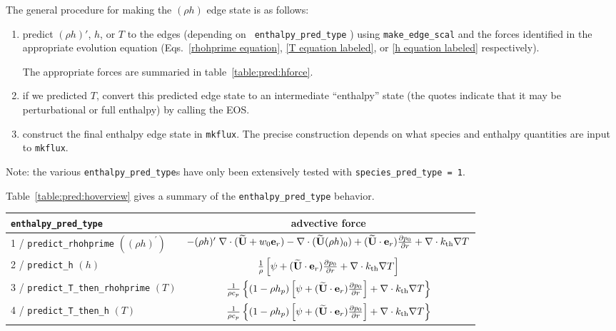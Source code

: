 The general procedure for making the $(\rho h)$ edge state is as follows:
\begin{enumerate}
\item predict $(\rho h)'$, $h$, or $T$ to the edges (depending on {\tt
  enthalpy\_pred\_type} ) using {\tt make\_edge\_scal} and the forces
  identified in the appropriate evolution equation
  (Eqs.~\ref{rhohprime equation}, \ref{T equation labeled}, or \ref{h
    equation labeled} respectively).

  The appropriate forces are summaried in table~\ref{table:pred:hforce}.

\item if we predicted $T$, convert this predicted
  edge state to an intermediate ``enthalpy'' state (the quotes
  indicate that it may be perturbational or full enthalpy) by calling
  the EOS.
 
\item construct the final enthalpy edge state in {\tt mkflux}.  The
  precise construction depends on what species and enthalpy quantities
  are input to {\tt mkflux}.

\end{enumerate}

\noindent Note: the various {\tt enthalpy\_pred\_type}s have only been
extensively tested with {\tt species\_pred\_type = 1}.

Table~\ref{table:pred:hoverview}
gives a summary
of the {\tt enthalpy\_pred\_type} behavior.


\begin{table*}[h]
\centering
\caption{Forcing term into {\tt make\_edge\_scal}}
\label{table:pred:hforce}
\renewcommand{\arraystretch}{1.5}
\begin{tabular}{l|c}
\hline
\hline
{\tt enthalpy\_pred\_type} &   {advective force} \\
\hline
1 / {\tt predict\_rhohprime} $((\rho h)^\prime)$ &  
 $-(\rho h)^\prime \; \nabla \cdot (\widetilde{{\bf U}}+w_0 \mathbf{e}_r) - 
 \nabla \cdot (\widetilde{{\bf U}} (\rho h)_0) + (\widetilde{{\bf U}} \cdot \mathbf{e}_r) \frac{\partial p_0}{\partial r} + \nabla \cdot k_{\rm th} \nabla T$ \\
2 / {\tt predict\_h}  $(h)$ & $\frac{1}{\rho} \left [\psi + (\widetilde{{\bf U}} \cdot \mathbf{e}_r)
  \frac{\partial p_0}{\partial r} + \nabla \cdot k_{\rm th} \nabla T \right ]$ \\
3 / {\tt predict\_T\_then\_rhohprime} $(T)$ & $\frac{1}{\rho c_p} \left \{ (1 - \rho h_p) 
   \left [\psi + (\widetilde{{\bf U}} \cdot \mathbf{e}_r) \frac{\partial p_0}{\partial r} \right ] + \nabla \cdot k_{\rm th} \nabla T \right \}$ \\
4 / {\tt predict\_T\_then\_h}  $(T)$ & $\frac{1}{\rho c_p} \left\{ (1 - \rho h_p) \left [\psi + (\widetilde{{\bf U}} \cdot \mathbf{e}_r)
\frac{\partial p_0}{\partial r}\right ] +  \nabla \cdot k_{\rm th} \nabla T \right\}$ \\
\hline
\end{tabular}
\end{table*}


